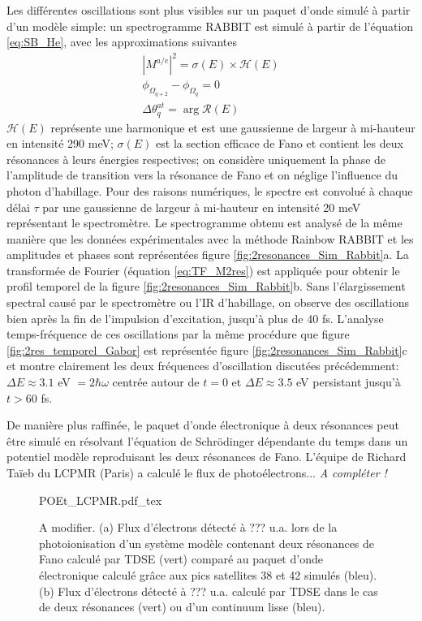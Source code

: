 Les différentes oscillations sont plus visibles sur un paquet d'onde simulé à partir d'un modèle simple: un spectrogramme RABBIT est simulé à partir de l'équation \ref{eq:SB_He}, avec les approximations suivantes
\begin{align}
|M^{a/e}|^2 =  \sigma(E) \times \mathcal{H} (E) \\
\phi_{\Omega_{q+2}} - \phi_{\Omega_{q}} = 0 \\
\Delta \theta_{q}^{at} = \arg \mathcal{R}(E)
\end{align}
$\mathcal{H} (E)$ représente une harmonique et est une gaussienne de largeur à mi-hauteur en intensité 290 meV; $\sigma (E)$ est la section efficace de Fano et contient les deux résonances à leurs énergies respectives; on considère uniquement la phase de l'amplitude de transition vers la résonance de Fano et on néglige l'influence du photon d'habillage. Pour des raisons numériques, le spectre est convolué à chaque délai $\tau$ par une gaussienne de largeur à mi-hauteur en intensité 20 meV représentant le spectromètre. Le spectrogramme obtenu est analysé de la même manière que les données expérimentales avec la méthode Rainbow RABBIT et les amplitudes et phases sont représentées figure \ref{fig:2resonances_Sim_Rabbit}a. La transformée de Fourier (équation \ref{eq:TF_M2res}) est appliquée pour obtenir le profil temporel de la figure \ref{fig:2resonances_Sim_Rabbit}b. Sans l'élargissement spectral causé par le spectromètre ou l'IR d'habillage, on observe des oscillations bien après la fin de l'impulsion d'excitation, jusqu'à plus de 40 fs. L'analyse temps-fréquence de ces oscillations par la même procédure que figure \ref{fig:2res_temporel_Gabor} est représentée figure \ref{fig:2resonances_Sim_Rabbit}c et montre clairement les deux fréquences d'oscillation discutées précédemment:  $\Delta E \approx 3.1$ eV $= 2 \hbar \omega$ centrée autour de $t = 0$ et $\Delta E \approx 3.5$ eV persistant jusqu'à $t > 60$ fs.

De manière plus raffinée, le paquet d'onde électronique à deux résonances peut être simulé en résolvant l'équation de Schrödinger dépendante du temps dans un potentiel modèle reproduisant les deux résonances de Fano. L'équipe de Richard Taïeb du LCPMR (Paris) a calculé le flux de photoélectrons...
\textit{A compléter !}

\begin{figure}
\centering
\def\svgwidth{0.9\textwidth}
{POEt_LCPMR.pdf_tex}
\caption{A modifier. (a) Flux d'électrons détecté à ??? u.a. lors de la photoionisation d'un système modèle contenant deux résonances de Fano calculé par TDSE (vert) comparé au paquet d'onde électronique calculé grâce aux pics satellites 38 et 42 simulés (bleu). (b) Flux d'électrons détecté à ??? u.a. calculé par TDSE dans le cas de deux résonances (vert) ou d'un continuum lisse (bleu).}
\label{fig:POEt_LCPMR}
\end{figure}

